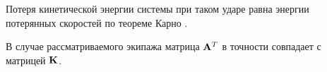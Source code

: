 Потеря кинетической энергии системы при таком ударе равна энергии потерянных скоростей по теореме Карно \cite{Vilke}.

В случае рассматриваемого экипажа матрица $\mathbf{A}^T$ в точности совпадает с матрицей $\mathbf{K}$.





%
%
